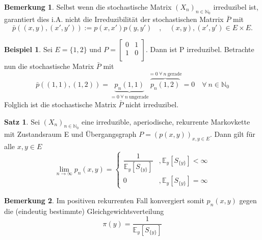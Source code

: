 \documentclass[a4paper,12pt]{scrartcl}
\theoremstyle{definition}
\newtheorem{bem}{Bemerkung}[section]
\newtheorem{sat}{Satz}[section]
\newtheorem{bsp}{Beispiel}[section]
\begin{document}
\begin{bem}
Selbst wenn die stochastische Matrix $(X_{n})_{n \in \mathbb{N}_{0}}$ irreduzibel ist, garantiert dies i.A. nicht die Irreduzibilität der stochastischen Matrrix $\bar{P}$ mit 
\begin{equation*}
\bar{p} \left( (x,y),(x',y') \right) := p(x,x')p(y,y') \quad , \quad (x,y),(x',y') \in E \times E.
\end{equation*}
\end{bem}
\clearpairofpagestyles
\ihead{\headmark}
\ohead{\pagemark}
\pagestyle{scrheadings}
\begin{bsp}
Sei $E= \lbrace 1,2 \rbrace$ und 
$P = \begin{bmatrix}
0 & 1 \\
1  & 0 \\
\end{bmatrix}$.
Dann ist P irreduzibel. Betrachte nun die stochastische Matrix $\bar{P}$ mit 
\begin{equation*}
\bar{p} \left( (1,1),(1,2) \right) = \underbrace{p_{n}(1,1)}_{= 0 \: \forall \: n \: \mathrm{ungerade}} \overbrace{p_{n}(1,2)}^{= 0 \: \forall \: n \: \mathrm{gerade}} = 0 \quad \forall \: n \in \mathbb{N}_{0}
\end{equation*}
Folglich ist die stochastische Matrix $\bar{P}$ nicht irreduzibel.
\end{bsp}
\begin{sat}
Sei $(X_{n})_{n \in \mathbb{N}_{0}}$ eine irreduzible, aperiodische, rekurrente Markovkette mit Zustandsraum E und Übergangsgraph $P = (p(x,y))_{x,y \in E}$. Dann gilt für alle $x,y \in E$
\begin{equation*}
\lim_{n \to \infty} p_{n}(x,y) =
\begin{cases}
\dfrac{1}{\mathbb{E}_{y}[S_{\lbrace y \rbrace}]} & , \mathbb{E}_{y}[S_{\lbrace y \rbrace}] < \infty\\
0 & , \mathbb{E}_{y}[S_{\lbrace y \rbrace}] = \infty 
\end{cases}
\end{equation*}
\end{sat}
\begin{bem}
Im positiven rekurrenten Fall konvergiert somit $p_{n}(x,y)$ gegen die (eindeutig bestimmte) Gleichgewichtsverteilung 
\begin{equation*}
\pi(y) = \dfrac{1}{\mathbb{E}_{y}[S_{\lbrace y \rbrace}]}
\end{equation*}
\end{bem}
\end{document}
